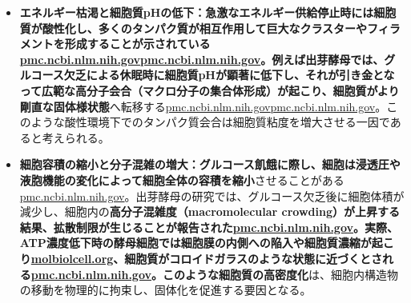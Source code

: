 \begin{itemize}
    \item \textbf{エネルギー枯渇と細胞質pHの低下：\textbf{急激なエネルギー供給停止時には細胞質が酸性化し、多くのタンパク質が相互作用して巨大なクラスターやフィラメントを形成することが示されている\href{https://pmc.ncbi.nlm.nih.gov/articles/PMC4850707/\#:~:text=it\%20to\%20be\%20associated\%20with,fluid\%20that\%20can\%20reversibly\%20transition}{pmc.ncbi.nlm.nih.gov}\href{https://pmc.ncbi.nlm.nih.gov/articles/PMC4850707/\#:~:text=Now\%2C\%20Munder\%20et\%20al,in\%20the\%20cytoplasm\%20becoming\%20stiffer}{pmc.ncbi.nlm.nih.gov}。例えば出芽酵母では、グルコース欠乏による休眠時に細胞質pHが顕著に低下し、それが引き金となって}広範な高分子会合（マクロ分子の集合体形成）\textbf{が起こり、細胞質が}より剛直な固体様状態}へ転移する\href{https://pmc.ncbi.nlm.nih.gov/articles/PMC4850707/\#:~:text=it\%20to\%20be\%20associated\%20with,fluid\%20that\%20can\%20reversibly\%20transition}{pmc.ncbi.nlm.nih.gov}\href{https://pmc.ncbi.nlm.nih.gov/articles/PMC4850707/\#:~:text=Now\%2C\%20Munder\%20et\%20al,in\%20the\%20cytoplasm\%20becoming\%20stiffer}{pmc.ncbi.nlm.nih.gov}。このような酸性環境下でのタンパク質会合は細胞質粘度を増大させる一因であると考えられる。
    \item \textbf{細胞容積の縮小と分子混雑の増大：\textbf{グルコース飢餓に際し、細胞は浸透圧や液胞機能の変化によって}細胞全体の容積を縮小}させることがある\href{https://pmc.ncbi.nlm.nih.gov/articles/PMC6857596/\#:~:text=organisation,high\%20amounts\%20of\%20carbohydrates\%2C\%20possibly}{pmc.ncbi.nlm.nih.gov}。出芽酵母の研究では、グルコース欠乏後に細胞体積が減少し、細胞内の\textbf{高分子混雑度（macromolecular crowding）\textbf{が上昇する結果、拡散制限が生じることが報告された\href{https://pmc.ncbi.nlm.nih.gov/articles/PMC4811765/\#:~:text=undertakes\%20a\%20startling\%20transition\%20upon,which\%20cells\%20globally\%20alter\%20their}{pmc.ncbi.nlm.nih.gov}。実際、ATP濃度低下時の酵母細胞では細胞膜の内側への陥入や細胞質濃縮が起こり\href{https://www.molbiolcell.org/doi/10.1091/mbc.E20-02-0125\#:~:text=induces\%20a\%20massive\%20reorganization\%20of,a\%20\%E2\%80\%9Csolidification\%E2\%80\%9D\%20of\%20the\%20cytoplasm}{molbiolcell.org}、細胞質がコロイドガラスのような状態に近づくとされる\href{https://pmc.ncbi.nlm.nih.gov/articles/PMC6857596/\#:~:text=organisation,high\%20amounts\%20of\%20carbohydrates\%2C\%20possibly}{pmc.ncbi.nlm.nih.gov}。このような}細胞質の高密度化}は、細胞内構造物の移動を物理的に拘束し、固体化を促進する要因となる。

\end{itemize}
